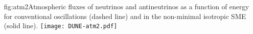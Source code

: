 \begin{dunefigure}{fig:atm2}{Atmospheric fluxes of neutrinos and antineutrinos as a function of energy for conventional oscillations (dashed line) and in the non-minimal isotropic SME (solid line).}
\texttt{[image: DUNE-atm2.pdf]}
\end{dunefigure}


